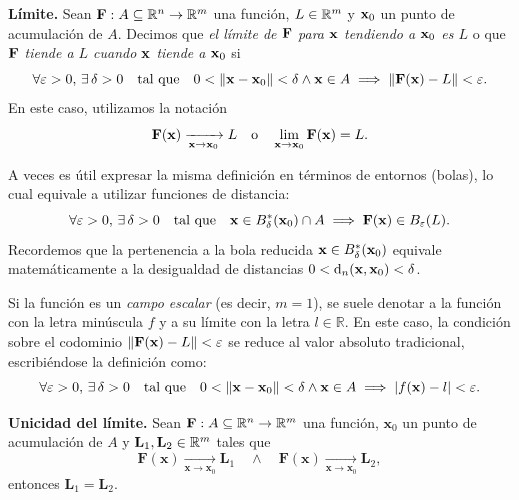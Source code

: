 \label{sec:limites}
\begin{definition} \textbf{L\'imite.} \label{def:limite_normas} 
Sean $\campoVec{F}:A \subseteq \Rn{n} \to \Rn{m}$ una funci\'on, $L \in \mathbb{R}^m$ y $\vect{x}_0$ un punto de acumulaci\'on de $A$. Decimos que \emph{el l\'imite de $\campoVec{F}$ para $\vect{x}$ tendiendo a $\vect{x}_0$ es $L$} o que \emph{$\campoVec{F}$ tiende a $L$ cuando $\vect{x}$ tiende a $\vect{x}_0$} si 
\[ 
\forall \varepsilon > 0, \, \exists \, \delta > 0 \quad \text{tal que} \quad 0 < \lVert \vect{x} - \vect{x}_0 \rVert < \delta \land \vect{x} \in A \implies \lVert \campoVec{F}(\vect{x}) - L \rVert < \varepsilon. 
\] 
En este caso, utilizamos la notaci\'on 
\[ 
\campoVec{F}(\vect{x}) \xrightarrow[\vect{x} \to \vect{x}_0]{} L \quad \text{o} \quad \lim_{\vect{x} \to \vect{x}_0} \campoVec{F}(\vect{x}) = L. 
\] 
\end{definition}



\begin{obs} \label{obs:entornos_distancias}
A veces es útil expresar la misma definición en t\'erminos de entornos (bolas), lo cual equivale a utilizar funciones de distancia:
\[ 
\forall \varepsilon > 0, \, \exists \, \delta > 0 \quad \text{tal que} \quad \vect{x} \in B_{\delta}^*(\vect{x}_0) \cap A \implies \campoVec{F}(\vect{x}) \in B_{\varepsilon}(L). 
\] 
Recordemos que la pertenencia a la bola reducida $\vect{x} \in B_{\delta}^*(\vect{x}_0)$ equivale matem\'aticamente a la desigualdad de distancias $0 < \dis_n(\vect{x},\vect{x}_0) < \delta$.
\end{obs}

\begin{obs} \label{obs:campo_escalar} 
Si la funci\'on es un \emph{campo escalar} (es decir, $m = 1$), se suele denotar a la funci\'on con la letra min\'uscula $f$ y a su l\'imite con la letra $l \in \mathbb{R}$. En este caso, la condici\'on sobre el codominio $\lVert \campoVec{F}(\vect{x}) - L \rVert < \varepsilon$ se reduce al valor absoluto tradicional, escribi\'endose la definici\'on como:
\[ 
\forall \varepsilon > 0, \, \exists \, \delta > 0 \quad \text{tal que} \quad 0 < \lVert \vect{x} - \vect{x}_0 \rVert < \delta \land \vect{x} \in A \implies \abs{f(\vect{x}) - l} < \varepsilon. 
\] 
\end{obs}


\begin{theorem}\textbf{Unicidad del l\'imite.} \label{teo:unicidad_limite} Sean $\mathbf{F}:A  \subseteq  \mathbb{R}^n \to \mathbb{R}^m$ una funci\'on, $\mathbf{x}_0$ un punto de acumulaci\'on de $A$ y $\mathbf{L}_1, \mathbf{L}_2 \in \mathbb{R}^m$ tales que 
\[
 \mathbf{F}(\mathbf{x}) \xrightarrow[\mathbf{x} \to \mathbf{x}_0]{} \mathbf{L}_1 \quad \wedge \quad \mathbf{F}(\mathbf{x}) \xrightarrow[\mathbf{x} \to \mathbf{x}_0]{} \mathbf{L}_2,
\]
entonces  $\mathbf{L}_1 = \mathbf{L}_2$.
\end{theorem}


